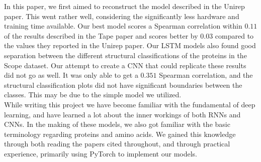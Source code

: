 In this paper, we first aimed to reconstruct the model described in the Unirep paper\cite{unirep}. This went rather well, considering the significantly less hardware and training time available. Our best model scores a Spearman correlation within $0.11$ of the results described in the Tape paper\cite{tape} and scores better by $0.03$ compared to the values they reported in the Unirep paper. Our LSTM models also found good separation between the different structural classifications of the proteins in the Scope dataset.\cite{scope} Our attempt to create a CNN that could replicate these results did not go as well. It was only able to get a $0.351$ Spearman correlation, and the structural classification plots did not have significant boundaries between the classes. This may be due to the simple model we utilized.\\

\noindent
While writing this project we have become familiar with the fundamental of deep learning, and have learned a lot about the inner workings of both RNNs and CNNs. In the making of these models, we also got familiar with the basic terminology regarding proteins and amino acids. We gained this knowledge through both reading the papers cited throughout, and through practical experience, primarily using PyTorch to implement our models.